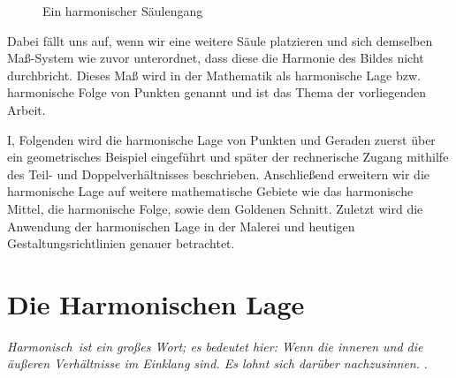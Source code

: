 \documentclass[12pt,a4paper]{article}
\begin{document}
\begin{figure}[htbp]
 \hfill
{}
\caption{Ein harmonischer Säulengang}
\label{fig:saeulen}
\end{figure}

Dabei fällt uns auf, wenn wir eine weitere Säule platzieren und sich demselben Maß-System wie zuvor unterordnet, dass diese die Harmonie des Bildes nicht durchbricht. Dieses Maß wird in der Mathematik als harmonische Lage bzw.~ harmonische Folge von Punkten genannt und ist das Thema der vorliegenden Arbeit.

I, Folgenden wird die harmonische Lage von Punkten und Geraden zuerst über ein geometrisches Beispiel eingeführt und später der rechnerische Zugang mithilfe des Teil- und Doppelverhältnisses beschrieben. Anschließend erweitern wir die harmonische Lage auf weitere mathematische Gebiete wie das harmonische Mittel, die harmonische Folge, sowie dem Goldenen Schnitt. Zuletzt wird die Anwendung der harmonischen Lage in der Malerei und heutigen Gestaltungsrichtlinien genauer betrachtet.

\newpage
\section{Die Harmonischen Lage}
\label{subsec:dieHarmonischeLage}

\textit{\glqq Harmonisch\grqq ~ist ein großes Wort; es bedeutet hier: Wenn die inneren und die äußeren Verhältnisse im Einklang sind. Es lohnt sich darüber nachzusinnen.} \citep[S.~53]{projektiveGeometrie}.
\end{document}
